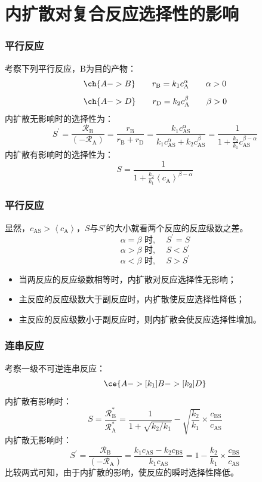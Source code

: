 \section{内扩散对复合反应选择性的影响}


\begin{frame}
    \frametitle{平行反应}

    考察下列平行反应，B为目的产物：
    \[
        \ch{A -> B} \qquad r_\mathrm{B} = k_1c_\mathrm{A}^ \alpha \qquad \alpha>0
    \]
    \[
        \ch{A -> D} \qquad r_\mathrm{D} = k_2c_\mathrm{A}^ \beta \qquad \beta>0
    \]
    内扩散无影响时的选择性为：
    \[
        S^{\prime}=\frac{\mathscr{R}_{\mathrm{B}}}{(-\mathscr{R}_{\mathrm{A}})}=\frac{r_{\mathrm{B}}}{r_{\mathrm{B}}+r_{\mathrm{D}}}=\frac{k_{1} c_{\mathrm{AS}}^{\alpha}}{k_{1} c_{\mathrm{AS}}^{\alpha}+k_{2} c_{\mathrm{AS}}^{\beta}}=\frac{1}{1+\frac{k_{2}}{k_{1}} c_{\mathrm{AS}}^{\beta-\alpha}} 
    \]
    内扩散有影响时的选择性为：
    \[
        S=\frac{1}{1+\frac{k_{2}}{k_{1}}\left\langle c_{\mathrm{A}}\right\rangle^{\beta-\alpha}}
    \]

\end{frame}


\begin{frame}
    \frametitle{平行反应}

    显然，$c_{\mathrm{AS}} > \left\langle c_{\mathrm{A}}\right\rangle$，$S$与$S'$的大小就看两个反应的反应级数之差。
    \[
        \alpha=\beta \text { 时, } \quad S^{\prime}=S
    \]
    \[
        \alpha>\beta \text { 时, } \quad S<S^{\prime}
    \]
    \[
        \alpha<\beta \text { 时, } \quad S>S^{\prime}
    \] 
    \begin{itemize}
        \item 当两反应的反应级数相等时，内扩散对反应选择性无影响；
        \item 主反应的反应级数大于副反应时，内扩散使反应选择性降低；
        \item 主反应的反应级数小于副反应时，则内扩散会使反应选择性增加。
    \end{itemize}

\end{frame}


\begin{frame}
    \frametitle{连串反应}
    考察一级不可逆连串反应：
    \[
        \ce{A ->[k_1] B ->[k_2] D}
    \]
    内扩散有影响时：
    \[
        S=\frac{\mathscr{R}_{\mathrm{B}}^{*}}{\mathscr{R}_{\mathrm{A}}^{*}}=\frac{1}{1+\sqrt{k_{2} / k_{1}}}-\sqrt{\frac{k_{2}}{k_{1}}} \times \frac{c_{\mathrm{BS}}}{c_{\mathrm{AS}}} 
    \]
    内扩散无影响时：
    \[
        S^{\prime}=\frac{\mathscr{R}_{\mathrm{B}}}{(-\mathscr{R}_{\mathrm{A}})}=\frac{k_{1} c_{\mathrm{AS}}-k_{2} c_{\mathrm{BS}}}{k_{1} c_{\mathrm{AS}}}=1-\frac{k_{2}}{k_{1}} \times \frac{c_{\mathrm{BS}}}{c_{\mathrm{AS}}}
    \]
    比较两式可知，由于内扩散的影响，使反应的瞬时选择性降低。

\end{frame}


